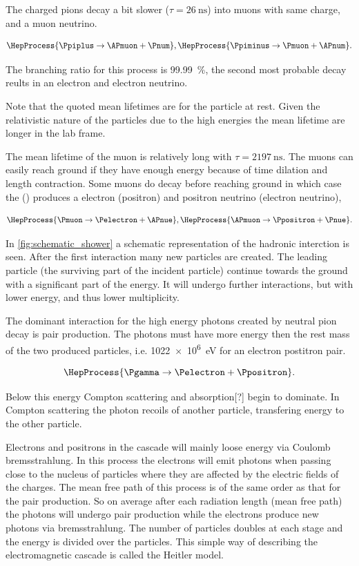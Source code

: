 The charged pions decay a bit slower ($\tau = \SI{26}{\ns}$) into muons with same charge, and a muon neutrino.

\begin{equation}
\HepProcess{\Ppiplus \to \APmuon + \Pnum},
\HepProcess{\Ppiminus \to \Pmuon + \APnum}.
\end{equation}

The branching ratio for this process is \SI{99.99}{\percent}, the second most probable decay reults in an electron and electron neutrino.

Note that the quoted mean lifetimes are for the particle at rest. Given the relativistic nature of the particles due to the high energies the mean lifetime are longer in the lab frame.

The mean lifetime of the muon is relatively long with $\tau = \SI{2197}{\ns}$. The muons can easily reach ground if they have enough energy because of time dilation and length contraction. Some muons do decay before reaching ground in which case the \Pmuon (\APmuon) produces a electron (positron) and positron neutrino (electron neutrino),

\begin{equation}
\HepProcess{\Pmuon \to \Pelectron + \APnue}, \\
\HepProcess{\APmuon \to \Ppositron + \Pnue}.
\end{equation}

In \cref{fig:schematic_shower} a schematic representation of the hadronic interction is seen. After the first interaction many new particles are created. The leading particle (the surviving part of the incident particle) continue towards the ground with a significant part of the energy. It will undergo further interactions, but with lower energy, and thus lower multiplicity.

The dominant interaction for the high energy photons created by neutral pion decay is pair production. The photons must have more energy then the rest mass of the two produced particles, i.e. \SI{1022e6}{\eV} for an electron postitron pair.

\begin{equation}
\HepProcess{\Pgamma \to \Pelectron + \Ppositron}.
\end{equation}

Below this energy Compton scattering and absorption[?] begin to dominate. In Compton scattering the photon recoils of another particle, transfering energy to the other particle.

Electrons and positrons in the cascade will mainly loose energy via Coulomb bremsstrahlung. In this process the electrons will emit photons when passing close to the nucleus of particles where they are affected by the electric fields of the charges. The mean free path of this process is of the same order as that for the pair production. So on average after each radiation length (mean free path) the photons will undergo pair production while the electrons produce new photons via bremsstrahlung. The number of particles doubles at each stage and the energy is divided over the particles. This simple way of describing the electromagnetic cascade is called the Heitler model.


